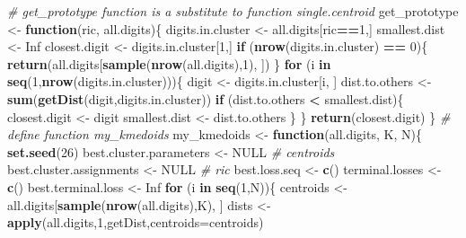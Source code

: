 \documentclass[]{article}
\newenvironment{Shaded}{\begin{snugshade}}{\end{snugshade}}
\newcommand{\KeywordTok}[1]{\textcolor[rgb]{0.13,0.29,0.53}{\textbf{#1}}}
\newcommand{\DataTypeTok}[1]{\textcolor[rgb]{0.13,0.29,0.53}{#1}}
\newcommand{\DecValTok}[1]{\textcolor[rgb]{0.00,0.00,0.81}{#1}}
\newcommand{\StringTok}[1]{\textcolor[rgb]{0.31,0.60,0.02}{#1}}
\newcommand{\CommentTok}[1]{\textcolor[rgb]{0.56,0.35,0.01}{\textit{#1}}}
\newcommand{\OtherTok}[1]{\textcolor[rgb]{0.56,0.35,0.01}{#1}}
\newcommand{\ControlFlowTok}[1]{\textcolor[rgb]{0.13,0.29,0.53}{\textbf{#1}}}
\newcommand{\OperatorTok}[1]{\textcolor[rgb]{0.81,0.36,0.00}{\textbf{#1}}}
\newcommand{\NormalTok}[1]{#1}
\begin{document}
\begin{Shaded}
\begin{Highlighting}[]
\CommentTok{# get_prototype function is a substitute to function single.centroid}
\NormalTok{get_prototype <-}\StringTok{ }\ControlFlowTok{function}\NormalTok{(ric, all.digits)\{}
\NormalTok{  digits.in.cluster <-}\StringTok{ }\NormalTok{all.digits[ric}\OperatorTok{==}\DecValTok{1}\NormalTok{,]}
\NormalTok{  smallest.dist <-}\StringTok{ }\OtherTok{Inf}
\NormalTok{  closest.digit <-}\StringTok{ }\NormalTok{digits.in.cluster[}\DecValTok{1}\NormalTok{,]}
  \ControlFlowTok{if}\NormalTok{ (}\KeywordTok{nrow}\NormalTok{(digits.in.cluster) }\OperatorTok{==}\StringTok{ }\DecValTok{0}\NormalTok{)\{}
    \KeywordTok{return}\NormalTok{(all.digits[}\KeywordTok{sample}\NormalTok{(}\KeywordTok{nrow}\NormalTok{(all.digits),}\DecValTok{1}\NormalTok{), ])}
\NormalTok{  \}}
  \ControlFlowTok{for}\NormalTok{ (i }\ControlFlowTok{in} \KeywordTok{seq}\NormalTok{(}\DecValTok{1}\NormalTok{,}\KeywordTok{nrow}\NormalTok{(digits.in.cluster)))\{}
\NormalTok{    digit <-}\StringTok{ }\NormalTok{digits.in.cluster[i, ]}
\NormalTok{    dist.to.others <-}\StringTok{ }\KeywordTok{sum}\NormalTok{(}\KeywordTok{getDist}\NormalTok{(digit,digits.in.cluster))}
    \ControlFlowTok{if}\NormalTok{ (dist.to.others }\OperatorTok{<}\StringTok{ }\NormalTok{smallest.dist)\{}
\NormalTok{      closest.digit <-}\StringTok{ }\NormalTok{digit}
\NormalTok{      smallest.dist <-}\StringTok{ }\NormalTok{dist.to.others}
\NormalTok{    \}}
\NormalTok{  \}}
  \KeywordTok{return}\NormalTok{(closest.digit)}
\NormalTok{\}}
\CommentTok{# define function my_kmedoids}
\NormalTok{my_kmedoids <-}\StringTok{ }\ControlFlowTok{function}\NormalTok{(all.digits, K, N)\{}
  \KeywordTok{set.seed}\NormalTok{(}\DecValTok{26}\NormalTok{)}
\NormalTok{  best.cluster.parameters <-}\StringTok{ }\OtherTok{NULL} \CommentTok{# centroids}
\NormalTok{  best.cluster.assignments <-}\StringTok{ }\OtherTok{NULL} \CommentTok{# ric}
\NormalTok{  best.loss.seq <-}\StringTok{ }\KeywordTok{c}\NormalTok{()}
\NormalTok{  terminal.losses <-}\StringTok{ }\KeywordTok{c}\NormalTok{()}
\NormalTok{  best.terminal.loss <-}\StringTok{ }\OtherTok{Inf}
  \ControlFlowTok{for}\NormalTok{ (i }\ControlFlowTok{in} \KeywordTok{seq}\NormalTok{(}\DecValTok{1}\NormalTok{,N))\{}
\NormalTok{    centroids <-}\StringTok{ }\NormalTok{all.digits[}\KeywordTok{sample}\NormalTok{(}\KeywordTok{nrow}\NormalTok{(all.digits),K), ]}
\NormalTok{    dists <-}\StringTok{ }\KeywordTok{apply}\NormalTok{(all.digits,}\DecValTok{1}\NormalTok{,getDist,}\DataTypeTok{centroids=}\NormalTok{centroids)}

\end{Highlighting}
\end{Shaded}
\end{document}
